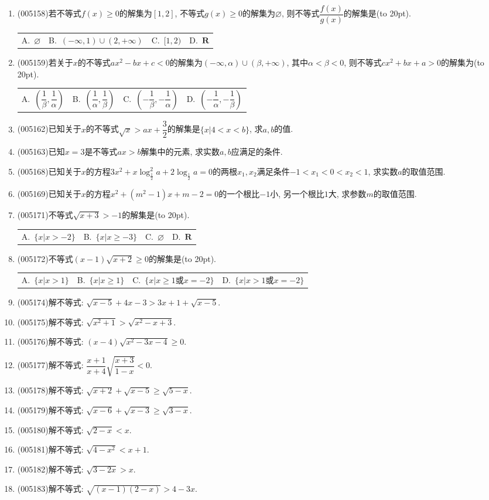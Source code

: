 \documentclass[10pt,a4paper]{article}
\newcommand{\bracket}[1]{(\hbox to #1pt{})}
\newcommand{\fourch}[4]{\par\begin{tabular}{p{.23\textwidth}p{.23\textwidth}p{.23\textwidth}p{.23\textwidth}}
A.~#1 &B.~#2& C.~#3& D.~#4
\end{tabular}}
\begin{document}
\begin{enumerate}[1.]
\item {\tiny (005158)}若不等式$f(x)\ge 0$的解集为$[1,2]$, 不等式$g(x)\ge 0$的解集为$\varnothing$, 则不等式$\dfrac{f(x)}{g(x)}$的解集是\bracket{20}.
\fourch{$\varnothing$}{$(-\infty ,1)\cup (2,+\infty)$}{$[1,2)$}{$\mathbf{R}$}
\item {\tiny (005159)}若关于$x$的不等式$ax^2-bx+c<0$的解集为$(-\infty ,\alpha)\cup (\beta ,+\infty)$, 其中$\alpha <\beta <0$, 则不等式$cx^2+bx+a>0$的解集为\bracket{20}.
\fourch{$(\dfrac 1{\beta},\dfrac 1{\alpha})$}{$(\dfrac 1{\alpha},\dfrac 1{\beta})$}{$(-\dfrac 1{\beta},-\dfrac 1{\alpha})$}{$(-\dfrac 1{\alpha},-\dfrac 1{\beta})$}
\item {\tiny (005162)}已知关于$x$的不等式$\sqrt x>ax+\dfrac 32$的解集是$\{x|4<x<b\}$, 求$a,b$的值.
\item {\tiny (005163)}已知$x=3$是不等式$ax>b$解集中的元素, 求实数$a,b$应满足的条件.
\item {\tiny (005168)}已知关于$x$的方程$3x^2+x\log_{\frac 12}^2a+2\log_{\frac 12}a=0$的两根$x_1,x_2$满足条件$-1<x_1<0<x_2<1$, 求实数$a$的取值范围.
\item {\tiny (005169)}已知关于$x$的方程$x^2+(m^2-1)x+m-2=0$的一个根比$-1$小, 另一个根比$1$大, 求参数$m$的取值范围.
\item {\tiny (005171)}不等式$\sqrt{x+3}>-1$的解集是\bracket{20}.
\fourch{$\{x|x>-2\}$}{$\{x|x\ge -3\}$}{$\varnothing$}{$\mathbf{R}$}
\item {\tiny (005172)}不等式$(x-1)\sqrt{x+2}\ge 0$的解集是\bracket{20}.
\fourch{$\{x|x>1\}$}{$\{x|x\ge 1\}$}{$\{x|x\ge 1\text{或}x=-2\}$}{$\{x|x>1\text{或}x=-2\}$}
\item {\tiny (005174)}解不等式: $\sqrt{x-5}+4x-3>3x+1+\sqrt{x-5}$.
\item {\tiny (005175)}解不等式: $\sqrt{x^2+1}>\sqrt{x^2-x+3}$.
\item {\tiny (005176)}解不等式: $(x-4)\sqrt{x^2-3x-4}\ge 0$.
\item {\tiny (005177)}解不等式: $\dfrac{x+1}{x+4}\sqrt{\dfrac{x+3}{1-x}}<0$.
\item {\tiny (005178)}解不等式: $\sqrt{x+2}+\sqrt{x-5}\ge \sqrt{5-x}$.
\item {\tiny (005179)}解不等式: $\sqrt{x-6}+\sqrt{x-3}\ge \sqrt{3-x}$.
\item {\tiny (005180)}解不等式: $\sqrt{2-x}<x$.
\item {\tiny (005181)}解不等式: $\sqrt{4-x^2}<x+1$.
\item {\tiny (005182)}解不等式: $\sqrt{3-2x}>x$.
\item {\tiny (005183)}解不等式: $\sqrt{(x-1)(2-x)}>4-3x$.

\end{enumerate}
\end{document}
